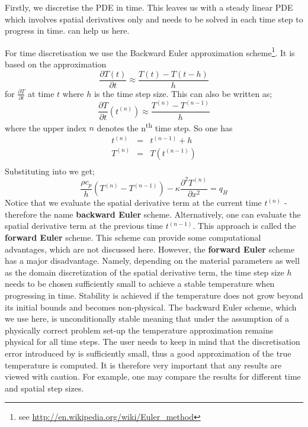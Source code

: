 Firstly, we discretise the PDE  in time. This leaves us with a
steady linear PDE which involves spatial derivatives only and needs to be solved
in each time step to progress in time. \esc can help us here.

For time discretisation we use the Backward Euler approximation
scheme\footnote{see \url{http://en.wikipedia.org/wiki/Euler_method}}. It is
based on the approximation 
\begin{equation}
\frac{\partial T(t)}{\partial t} \approx \frac{T(t)-T(t-h)}{h}
\label{eqn:beuler}
\end{equation}
for  $\frac{\partial T}{\partial t}$  at time $t$ 
where $h$ is the time step size. This can also be written as;
\begin{equation}
\frac{\partial T}{\partial t}(t^{(n)}) \approx \frac{T^{(n)} - T^{(n-1)}}{h}
\label{eqn:Tbeuler}
\end{equation}
where the upper index $n$ denotes the n\textsuperscript{th} time step. So one
has
\begin{equation}
\begin{array}{rcl}
t^{(n)} & = & t^{(n-1)}+h \\
T^{(n)} & = & T(t^{(n-1)}) \\ 
\end{array}
\label{eqn:Neuler}
\end{equation}
Substituting  into  we get;
\begin{equation}
\frac{\rho c_p}{h} (T^{(n)} - T^{(n-1)}) - \kappa \frac{\partial^{2}
T^{(n)}}{\partial x^{2}} = q_H 
\label{eqn:hddisc}
\end{equation}
Notice that we evaluate the spatial derivative term at the current time
$t^{(n)}$ - therefore the name \textbf{backward Euler} scheme. Alternatively,
one can evaluate the spatial derivative term at the previous time $t^{(n-1)}$.
This approach is called the \textbf{forward Euler} scheme. This scheme can
provide some computational advantages, which
are not discussed here. However, the \textbf{forward Euler} scheme has a major
disadvantage. Namely, depending on the 
material parameters as well as the domain discretization of the spatial
derivative term, the time step size $h$ needs to be chosen sufficiently small to
achieve a stable temperature when progressing in time. Stability is achieved if
the temperature does not grow beyond its initial bounds and becomes
non-physical. 
The backward Euler scheme, which we use here, is unconditionally stable meaning
that under the assumption of a
physically correct problem set-up the temperature approximation remains physical
for all time steps. 
The user needs to keep in mind that the discretisation error introduced by
is sufficiently small, thus a good approximation of the true temperature is
computed. It is therefore very important that any results are viewed with
caution. For example, one may compare the results for different time and
spatial step sizes.

